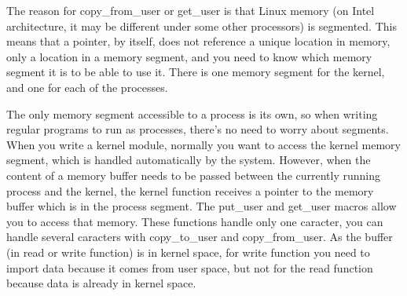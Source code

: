 \documentclass[11pt]{article}
\begin{document}
The reason for copy\_from\_user or get\_user is that Linux memory (on Intel architecture, it may be different under some other processors) is segmented. This means that a pointer, by itself, does not reference a unique location in memory, only a location in a memory segment, and you need to know which memory segment it is to be able to use it. There is one memory segment for the kernel, and one for each of the processes.

The only memory segment accessible to a process is its own, so when writing regular programs to run as processes, there's no need to worry about segments. When you write a kernel module, normally you want to access the kernel memory segment, which is handled automatically by the system. However, when the content of a memory buffer needs to be passed between the currently running process and the kernel, the kernel function receives a pointer to the memory buffer which is in the process segment. The put\_user and get\_user macros allow you to access that memory. These functions handle only one caracter, you can handle several caracters with copy\_to\_user and copy\_from\_user. As the buffer (in read or write function) is in kernel space, for write function you need to import data because it comes from user space, but not for the read function because data is already in kernel space.
\end{document}
